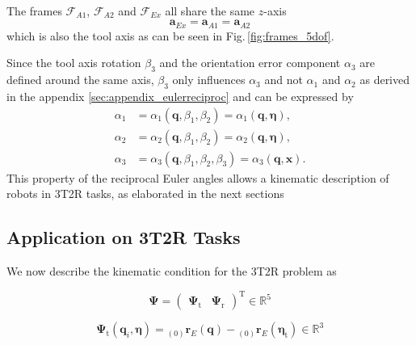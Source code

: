 \documentclass[twocolumn,10pt]{IFTOMM}
\newcommand{\bm}[1]{\boldsymbol{#1}}
\newcommand{\ortvek}[4]{{ }_{(#1)}{\boldsymbol{#2}}^{#3}_{#4} }
\newcommand{\vek}[3]{\boldsymbol{#1}^{#2}_{#3}}
\newcommand{\transp}[0]{{\mathrm{T}}}
\newcommand{\ks}[1]{{\mathcal{F}}_{#1}}
\begin{document}
The frames $\ks{A1}$, $\ks{A2}$ and $\ks{Ex}$ all share the same $z$-axis
%
\begin{equation}
\vek{a}{}{Ex}
=
\vek{a}{}{A1}
=
\vek{a}{}{A2}
\end{equation}
%
which is also the tool axis as can be seen in Fig.\,\ref{fig:frames_5dof}.

Since the tool axis rotation $\beta_3$ and the orientation error component $\alpha_3$ are defined around the same axis, $\beta_3$ only influences $\alpha_3$ and not $\alpha_1$ and $\alpha_2$ as derived in the appendix \ref{sec:appendix_eulerreciproc} and can be expressed by
%
\begin{align}
\alpha_1&=\alpha_1(\bm{q},\beta_1,\beta_2) = \alpha_1(\bm{q},\bm{\eta}) \label{equ:alpha1_dep_beta},\\
\alpha_2&=\alpha_2(\bm{q},\beta_1,\beta_2) = \alpha_2(\bm{q},\bm{\eta}) \label{equ:alpha2_dep_beta},\\
\alpha_3&=\alpha_3(\bm{q},\beta_1,\beta_2,\beta_3) = \alpha_3(\bm{q},\bm{x})  \label{equ:alpha3_dep_beta}.
\end{align}
%
This property of the reciprocal Euler angles allows a kinematic description of robots in 3T2R tasks, as elaborated in the next sections

\subsection{Application on 3T2R Tasks}


We now describe the kinematic condition for the 3T2R problem as

\begin{equation}
\bm{\Psi}=\begin{pmatrix}
\bm{\Psi}_{\mathrm{t}} & \bm{\Psi}_{\mathrm{r}}
\end{pmatrix}^\transp \in {\mathbb{R}}^{5}
\end{equation}

\begin{equation}
\bm{\Psi}_{\mathrm{t}}(\bm{q}_i,\bm{\eta}) = \ortvek{0}{r}{}{E}(\bm{q}) - \ortvek{0}{r}{}{E}(\bm{\eta}_{\mathrm{t}}) \in {\mathbb{R}}^{3}
\end{equation}
\end{document}

